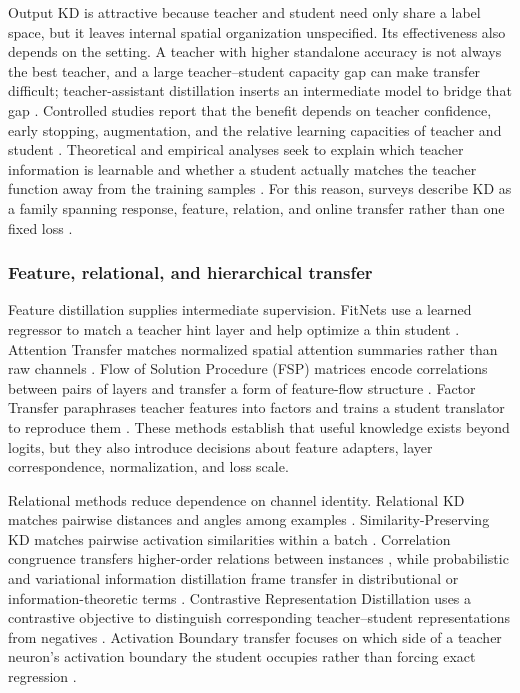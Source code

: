 Output KD is attractive because teacher and student need only share a label
space, but it leaves internal spatial organization unspecified. Its
effectiveness also depends on the setting. A teacher with higher standalone accuracy is not always the
best teacher, and a large teacher--student capacity gap can make transfer
difficult; teacher-assistant distillation inserts an intermediate model to
bridge that gap \cite{mirzadeh2020takd}. Controlled studies report that the
benefit depends on teacher confidence, early stopping, augmentation, and the
relative learning capacities of teacher and student
\cite{cho2019efficacy,beyer2022patient}. Theoretical and empirical analyses
seek to explain which teacher information is learnable and whether a student
actually matches the teacher function away from the training samples
\cite{phuong2019understandingkd,stanton2021doeskd}. For this reason, surveys
describe KD as a family spanning response, feature, relation, and online
transfer rather than one fixed loss \cite{gou2021kdsurvey,wang2021kdreview}.

\subsubsection{Feature, relational, and hierarchical transfer}

Feature distillation supplies intermediate supervision. FitNets use a learned
regressor to match a teacher hint layer and help optimize a thin student
\cite{romero2015fitnets}. Attention Transfer matches normalized spatial
attention summaries rather than raw channels \cite{zagoruyko2017attention}.
Flow of Solution Procedure (FSP) matrices encode correlations between pairs of
layers and transfer a form of
feature-flow structure \cite{yim2017fsp}. Factor Transfer paraphrases teacher
features into factors and trains a student translator to reproduce them
\cite{kim2018factortransfer}. These methods establish that useful knowledge
exists beyond logits, but they also introduce decisions about feature adapters,
layer correspondence, normalization, and loss scale.

Relational methods reduce dependence on channel identity. Relational KD
matches pairwise distances and angles among examples
\cite{park2019rkd}. Similarity-Preserving KD matches pairwise activation
similarities within a batch \cite{tung2019similarity}. Correlation congruence
transfers higher-order relations between instances
\cite{peng2019correlation}, while probabilistic and variational information
distillation frame transfer in distributional or information-theoretic terms
\cite{passalis2018probabilistic,ahn2019vid}. Contrastive Representation
Distillation uses a contrastive objective to distinguish corresponding
teacher--student representations from negatives \cite{tian2020crd}. Activation
Boundary transfer focuses on which side of a teacher neuron's activation
boundary the student occupies rather than forcing exact regression
\cite{heo2019activation}.

